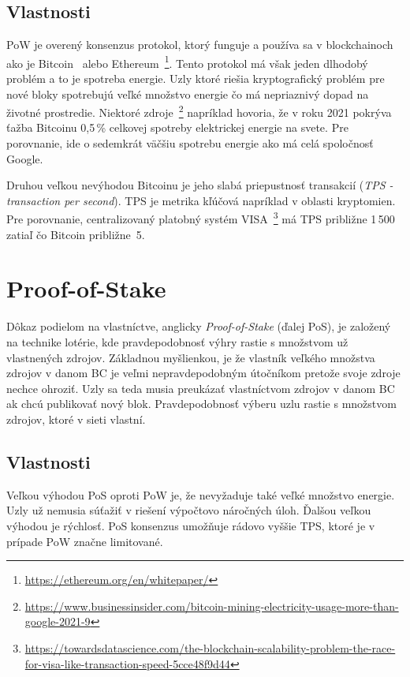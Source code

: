 \subsection{Vlastnosti}
PoW je overený konsenzus protokol, ktorý funguje a používa sa v blockchainoch ako je Bitcoin~\cite{satoshiBitcoin} alebo Ethereum~\footnote{\url{https://ethereum.org/en/whitepaper/}}. Tento protokol má však jeden dlhodobý problém a to je spotreba energie. Uzly ktoré riešia kryptografický problém pre nové bloky spotrebujú veľké množstvo energie čo má nepriaznivý dopad na životné prostredie. Niektoré zdroje~\footnote{\url{https://www.businessinsider.com/bitcoin-mining-electricity-usage-more-than-google-2021-9}} napríklad hovoria, že v roku 2021 pokrýva ťažba Bitcoinu 0,5\,\% celkovej spotreby elektrickej energie na svete. Pre porovnanie, ide o sedemkrát väčšiu spotrebu energie ako má celá spoločnosť Google.~\cite{leporeConsensus}

Druhou veľkou nevýhodou Bitcoinu je jeho slabá priepustnosť transakcií (\textit{TPS - transaction per second}). TPS je metrika kľúčová napríklad v oblasti kryptomien. Pre porovnanie, centralizovaný platobný systém VISA~\footnote{\url{https://towardsdatascience.com/the-blockchain-scalability-problem-the-race-for-visa-like-transaction-speed-5cce48f9d44}} má TPS približne 1\,500 zatiaľ čo Bitcoin približne~5.

\section{Proof-of-Stake}\label{sec:pos}

Dôkaz podielom na vlastníctve, anglicky \textit{Proof-of-Stake} (ďalej PoS), je založený na technike lotérie, kde pravdepodobnosť výhry rastie s množstvom už vlastnených zdrojov. Základnou myšlienkou, je že vlastník veľkého množstva zdrojov v danom BC je veľmi nepravdepodobným útočníkom pretože svoje zdroje nechce ohroziť. Uzly sa teda musia preukázať vlastníctvom zdrojov v danom BC ak chcú publikovať nový blok. Pravdepodobnosť výberu uzlu rastie s množstvom zdrojov, ktoré v sieti vlastní.~\cite{homoliakBlockchain, nguyenPos}

\subsection{Vlastnosti}

Veľkou výhodou PoS oproti PoW je, že nevyžaduje také veľké množstvo energie. Uzly už nemusia súťažiť v riešení výpočtovo náročných úloh. Ďalšou veľkou výhodou je rýchlosť. PoS konsenzus umožňuje rádovo vyššie TPS, ktoré je v prípade PoW značne limitované.~\cite{leporeConsensus, nguyenPos}

